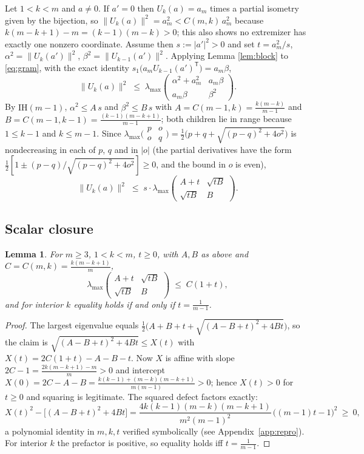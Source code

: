 \documentclass[11pt]{article}
\newtheorem{lemma}{Lemma}
\theoremstyle{remark}
\begin{document}
Let $1<k<m$ and $a\ne0$. If $a'=0$ then
$U_k(a)=a_m$ times a partial isometry given by the bijection, so
$\|U_k(a)\|^2=a_m^2<C(m,k)\,a_m^2$ because
$k(m-k+1)-m=(k-1)(m-k)>0$; this also shows no extremizer has exactly one
nonzero coordinate. Assume then $s:=|a'|^2>0$ and set
$t=a_m^2/s$, $\alpha^2=\|U_k(a')\|^2$, $\beta^2=\|U_{k-1}(a')\|^2$.
Applying Lemma \ref{lem:block} to \eqref{eq:gram}, with the exact identity
$s_1\bigl(a_mU_{k-1}(a')^{\mathsf T}\bigr)=a_m\beta$,
\[
\|U_k(a)\|^2\;\le\;\lambda_{\max}
\begin{pmatrix}\alpha^2+a_m^2& a_m\beta\\ a_m\beta&\beta^2\end{pmatrix}.
\]
By $\mathrm{IH}(m-1)$,
$\alpha^2\le A\,s$ and $\beta^2\le B\,s$ with
$A=C(m-1,k)=\frac{k(m-k)}{m-1}$ and $B=C(m-1,k-1)=\frac{(k-1)(m-k+1)}{m-1}$;
both children lie in range because $1\le k-1$ and $k\le m-1$.
Since $\lambda_{\max}\bigl(\begin{smallmatrix}p&o\\ o&q\end{smallmatrix}\bigr)
=\tfrac12\bigl(p+q+\sqrt{(p-q)^2+4o^2}\bigr)$ is nondecreasing in each of
$p$, $q$ and in $|o|$ (the partial derivatives have the form
$\tfrac12[1\pm(p-q)/\sqrt{(p-q)^2+4o^2}]\ge0$, and the bound in $o$ is
even),
\begin{equation}\label{eq:corner}
\|U_k(a)\|^2\;\le\; s\cdot
\lambda_{\max}\begin{pmatrix}A+t&\sqrt{tB}\\ \sqrt{tB}&B\end{pmatrix}.
\end{equation}

\subsection{Scalar closure}\label{subsec:closure}

\begin{lemma}\label{lem:closure}
For $m\ge3$, $1<k<m$, $t\ge0$, with $A,B$ as above and
$C=C(m,k)=\frac{k(m-k+1)}{m}$,
\[
\lambda_{\max}\begin{pmatrix}A+t&\sqrt{tB}\\ \sqrt{tB}&B\end{pmatrix}
\;\le\; C(1+t),
\]
and for interior $k$ equality holds if and only if $t=\frac1{m-1}$.
\end{lemma}
\begin{proof}
The largest eigenvalue equals $\tfrac12\bigl(A+B+t+\sqrt{(A-B+t)^2+4Bt}\bigr)$,
so the claim is $\sqrt{(A-B+t)^2+4Bt}\le X(t)$ with
$X(t)=2C(1+t)-A-B-t$. Now $X$ is affine with slope
$2C-1=\frac{2k(m-k+1)-m}{m}>0$ and intercept
$X(0)=2C-A-B=\frac{k(k-1)+(m-k)(m-k+1)}{m(m-1)}>0$; hence $X(t)>0$ for
$t\ge0$ and squaring is legitimate. The squared defect factors exactly:
\[
X(t)^2-\bigl[(A-B+t)^2+4Bt\bigr]
=\frac{4k(k-1)(m-k)(m-k+1)}{m^2(m-1)^2}\,\bigl((m-1)t-1\bigr)^2\ \ge\ 0,
\]
a polynomial identity in $m,k,t$ verified symbolically (see
Appendix~\ref{app:repro}). For interior $k$
the prefactor is positive, so equality holds iff $t=\frac1{m-1}$.
\end{proof}
\end{document}
